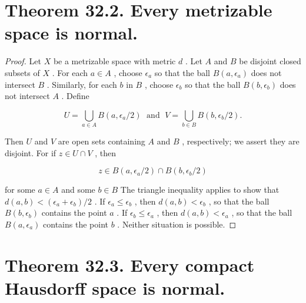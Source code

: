 \section*{Theorem 32.2. Every metrizable space is normal.}

\begin{proof}
Let \(X\) be a metrizable space with metric \(d\) . Let \(A\) and \(B\) be disjoint closed subsets of \(X\) . For each \(a \in  A\) , choose \({\epsilon }_{a}\) so that the ball \(B\left( {a,{\epsilon }_{a}}\right)\) does not intersect \(B\) . Similarly, for each \(b\) in \(B\) , choose \({\epsilon }_{b}\) so that the ball \(B\left( {b,{\epsilon }_{b}}\right)\) does not intersect \(A\) . Define

\[
U = \mathop{\bigcup }\limits_{{a \in  A}}B\left( {a,{\epsilon }_{a}/2}\right) \;\text{ and }\;V = \mathop{\bigcup }\limits_{{b \in  B}}B\left( {b,{\epsilon }_{b}/2}\right) .
\]

Then \(U\) and \(V\) are open sets containing \(A\) and \(B\) , respectively; we assert they are disjoint. For if \(z \in  U \cap  V\) , then

\[
z \in  B\left( {a,{\epsilon }_{a}/2}\right)  \cap  B\left( {b,{\epsilon }_{b}/2}\right)
\]

for some \(a \in  A\) and some \(b \in  B\) The triangle inequality applies to show that \(d\left( {a,b}\right)  < \left( {{\epsilon }_{a} + {\epsilon }_{b}}\right) /2\) . If \({\epsilon }_{a} \leq  {\epsilon }_{b}\) , then \(d\left( {a,b}\right)  < {\epsilon }_{b}\) , so that the ball \(B\left( {b,{\epsilon }_{b}}\right)\) contains the point \(a\) . If \({\epsilon }_{b} \leq  {\epsilon }_{a}\) , then \(d\left( {a,b}\right)  < {\epsilon }_{a}\) , so that the ball \(B\left( {a,{\epsilon }_{a}}\right)\) contains the point \(b\) . Neither situation is possible.
\end{proof}

\section*{Theorem 32.3. Every compact Hausdorff space is normal.}

